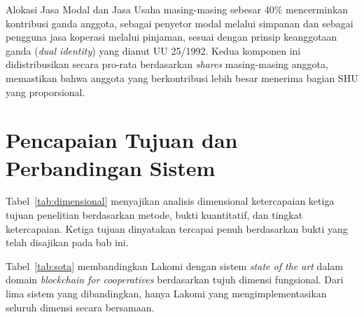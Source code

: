 Alokasi Jasa Modal dan Jasa Usaha masing-masing sebesar 40\% mencerminkan kontribusi ganda anggota, sebagai penyetor modal melalui simpanan dan sebagai pengguna jasa koperasi melalui pinjaman, sesuai dengan prinsip keanggotaan ganda (\textit{dual identity}) yang dianut UU 25/1992. Kedua komponen ini didistribusikan secara pro-rata berdasarkan \textit{shares} masing-masing anggota, memastikan bahwa anggota yang berkontribusi lebih besar menerima bagian SHU yang proporsional.

\section{Pencapaian Tujuan dan Perbandingan Sistem}

Tabel~\ref{tab:dimensional} menyajikan analisis dimensional ketercapaian ketiga tujuan penelitian berdasarkan metode, bukti kuantitatif, dan tingkat ketercapaian. Ketiga tujuan dinyatakan tercapai penuh berdasarkan bukti yang telah disajikan pada bab ini.

\begin{table}[H]
\centering
\caption{Analisis Dimensional Ketercapaian Tujuan Penelitian}
\label{tab:dimensional}
\footnotesize
{}
\end{table}

Tabel~\ref{tab:sota} membandingkan Lakomi dengan sistem \textit{state of the art} dalam domain \textit{blockchain for cooperatives} berdasarkan tujuh dimensi fungsional. Dari lima sistem yang dibandingkan, hanya Lakomi yang mengimplementasikan seluruh dimensi secara bersamaan.

